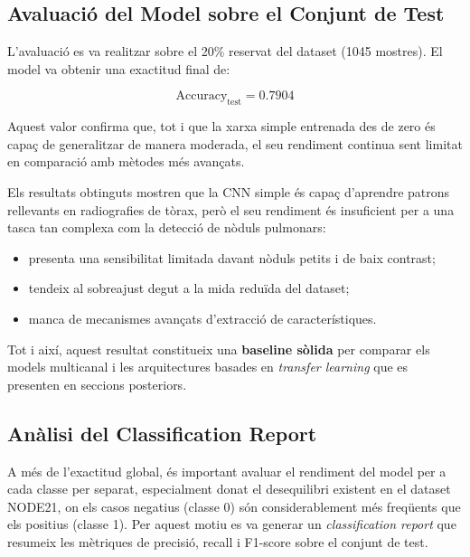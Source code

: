 \documentclass[12pt,a4paper]{article}
\begin{document}
\subsection{Avaluació del Model sobre el Conjunt de Test}

L’avaluació es va realitzar sobre el 20\% reservat del dataset (1045 mostres). El model
va obtenir una exactitud final de:

\[
\text{Accuracy}_{\text{test}} = 0.7904
\]

Aquest valor confirma que, tot i que la xarxa simple entrenada des de zero és capaç de
generalitzar de manera moderada, el seu rendiment continua sent limitat en comparació
amb mètodes més avançats.

Els resultats obtinguts mostren que la CNN simple és capaç d’aprendre patrons rellevants
en radiografies de tòrax, però el seu rendiment és insuficient per a una tasca tan
complexa com la detecció de nòduls pulmonars:

\begin{itemize}
    \item presenta una sensibilitat limitada davant nòduls petits i de baix contrast;
    \item tendeix al sobreajust degut a la mida reduïda del dataset;
    \item manca de mecanismes avançats d’extracció de característiques.
\end{itemize}

Tot i així, aquest resultat constitueix una \textbf{baseline sòlida} per comparar els
models multicanal i les arquitectures basades en \textit{transfer learning} que es
presenten en seccions posteriors.

\subsection{Anàlisi del Classification Report}

A més de l’exactitud global, és important avaluar el rendiment del model per a cada
classe per separat, especialment donat el desequilibri existent en el dataset NODE21,
on els casos negatius (classe 0) són considerablement més freqüents que els positius
(classe 1). Per aquest motiu es va generar un \textit{classification report} que resumeix
les mètriques de precisió, recall i F1-score sobre el conjunt de test.
\end{document}
